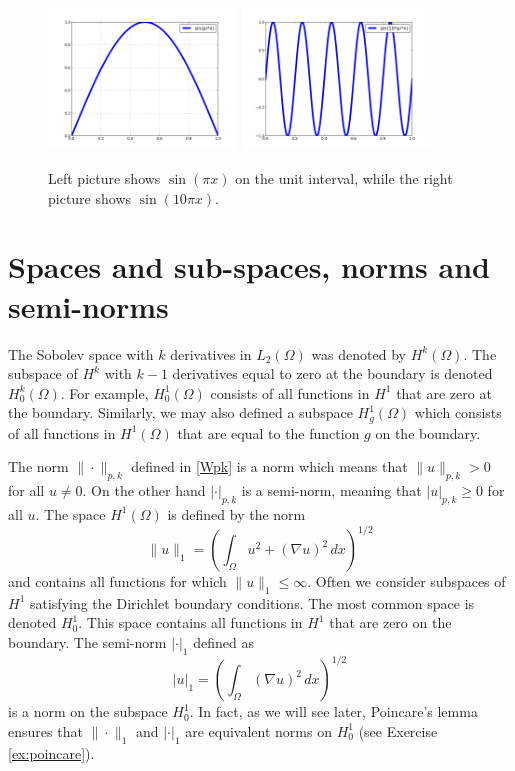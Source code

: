 \begin{figure}
\label{fig:sin}
\begin{center}
\includegraphics[width=5cm]{chapters/SobolevCrash/sin.png}
\includegraphics[width=5cm]{chapters/SobolevCrash/sin10.png}
\caption{Left picture shows $\sin(\pi x)$ on the unit interval, while 
the right picture shows $\sin(10 \pi x)$. }\label{fig:sin}
\end{center}
\end{figure}


\section{Spaces and sub-spaces, norms and semi-norms}

The Sobolev space with $k$ derivatives in $L_2(\Omega)$ was denoted by $H^k(\Omega)$. The subspace
of $H^k$ with $k-1$ derivatives equal to zero at the boundary is denoted 
$H^k_0(\Omega)$. For example, $H^1_0(\Omega)$ consists of all functions in $H^1$ that are zero 
at the boundary. Similarly, we may also defined a subspace  
$H^1_g(\Omega)$ which consists of all functions in $H^1(\Omega)$ that are equal to the function $g$ 
on the boundary. 

The norm $\|\cdot\|_{p,k}$ defined in \eqref{Wpk} is a norm
which means that $\|u\|_{p,k} > 0$ for all $u\not=0$.    
On the other hand  $|\cdot|_{p,k}$ is a semi-norm, meaning 
that $|u|_{p,k} \ge  0$ for all $u$.   
The space $H^1(\Omega)$ is defined by the norm 
\[
\|u\|_1 = (\int_\Omega u^2 + (\nabla u)^2 \, dx)^{1/2}  
\]
and contains all functions for which $\|u\|_1 \le \infty$. 
Often we consider subspaces of $H^1$ satisfying the Dirichlet boundary conditions. 
The most common space is denoted $H^1_0$. This space contains all functions 
in $H^1$ that are zero on the boundary.  
The semi-norm $|\cdot|_1$ defined as 
\[
|u|_1 = (\int_\Omega  (\nabla u)^2 \, dx)^{1/2}  
\]
is a norm on the subspace $H^1_0$. In fact, as we will see later, Poincare's lemma
ensures that $\|\cdot\|_1$ and  $|\cdot|_1$ are equivalent norms on $H^1_0$ (see Exercise \ref{ex:poincare}).  





